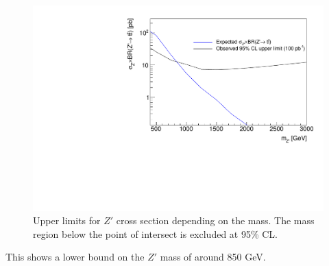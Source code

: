 \begin{figure}
 \includegraphics[width=\textwidth]{../pics/limits.pdf}
 \caption{Upper limits for $Z'$ cross section depending on the mass. The mass region below the point of intersect is excluded at 95\% CL.}
 \label{pic:limits}
\end{figure}
This shows a lower bound on the $Z'$ mass of around 850 GeV. 




